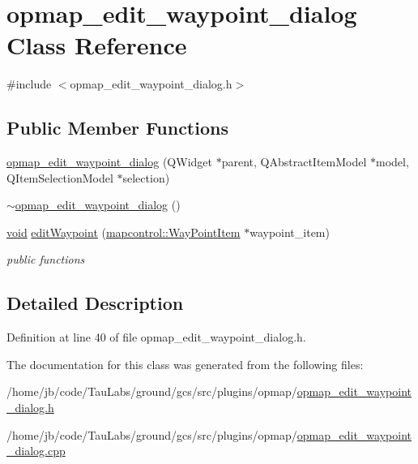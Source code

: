 \hypertarget{classopmap__edit__waypoint__dialog}{\section{opmap\-\_\-edit\-\_\-waypoint\-\_\-dialog \-Class \-Reference}
\label{classopmap__edit__waypoint__dialog}
}


{\ttfamily \#include $<$opmap\-\_\-edit\-\_\-waypoint\-\_\-dialog.\-h$>$}

\subsection*{\-Public \-Member \-Functions}
\begin{DoxyCompactItemize}
\item 
\hyperlink{group___o_p_map_plugin_ga0681c04758995d1dca076a79d6c7ebb8}{opmap\-\_\-edit\-\_\-waypoint\-\_\-dialog} (\-Q\-Widget $\ast$parent, \-Q\-Abstract\-Item\-Model $\ast$model, \-Q\-Item\-Selection\-Model $\ast$selection)
\item 
\hyperlink{group___o_p_map_plugin_ga7d3684f9a7139a132614c5f4d9d91910}{$\sim$opmap\-\_\-edit\-\_\-waypoint\-\_\-dialog} ()
\item 
\hyperlink{group___u_a_v_objects_plugin_ga444cf2ff3f0ecbe028adce838d373f5c}{void} \hyperlink{group___o_p_map_plugin_gaf5d4c9a4e4bc3c4b358df3168b2e6b03}{edit\-Waypoint} (\hyperlink{classmapcontrol_1_1_way_point_item}{mapcontrol\-::\-Way\-Point\-Item} $\ast$waypoint\-\_\-item)
\begin{DoxyCompactList}\small\item\em public functions \end{DoxyCompactList}\end{DoxyCompactItemize}


\subsection{\-Detailed \-Description}


\-Definition at line 40 of file opmap\-\_\-edit\-\_\-waypoint\-\_\-dialog.\-h.



\-The documentation for this class was generated from the following files\-:\begin{DoxyCompactItemize}
\item 
/home/jb/code/\-Tau\-Labs/ground/gcs/src/plugins/opmap/\hyperlink{opmap__edit__waypoint__dialog_8h}{opmap\-\_\-edit\-\_\-waypoint\-\_\-dialog.\-h}\item 
/home/jb/code/\-Tau\-Labs/ground/gcs/src/plugins/opmap/\hyperlink{opmap__edit__waypoint__dialog_8cpp}{opmap\-\_\-edit\-\_\-waypoint\-\_\-dialog.\-cpp}\end{DoxyCompactItemize}
